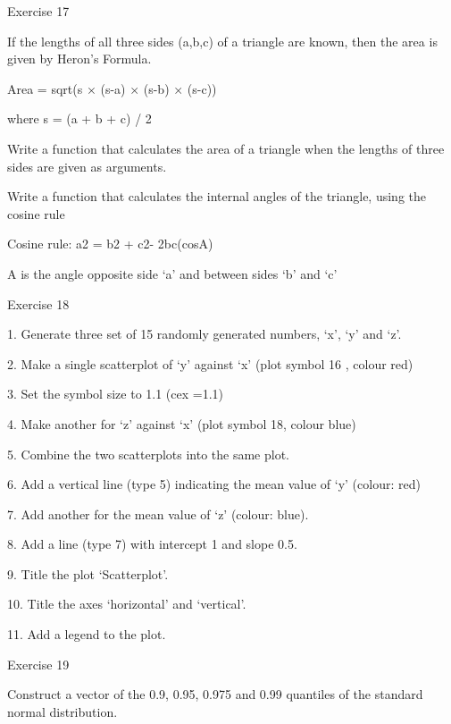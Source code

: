  

Exercise 17

 

If the lengths of all three sides (a,b,c) of a triangle are known, then the area is given by Heron's Formula.

Area = sqrt(s × (s-a) × (s-b) × (s-c))

 

where s = (a + b + c) / 2

 

Write a function that calculates the area of a triangle when the lengths of three sides are given as arguments.

 

Write a function that calculates the internal angles of the triangle, using the cosine rule

Cosine rule: a2 = b2 + c2- 2bc(cosA)

 

A is the angle opposite side ‘a’ and between sides ‘b’ and ‘c’

 

Exercise 18

 
1.
Generate three set of 15 randomly generated numbers, ‘x’, ‘y’ and ‘z’.

2.
Make a single scatterplot of ‘y’ against ‘x’               (plot symbol 16 , colour red)

3.
Set the symbol size to 1.1                                           (cex =1.1)

4.
Make another for ‘z’ against ‘x’                             (plot symbol 18, colour blue)

5.
Combine the two scatterplots into the same plot.

6.
Add a vertical line (type 5) indicating the mean value of ‘y’ (colour: red)

7.
Add another for the mean value of ‘z’                (colour: blue).

8.
Add a line (type 7) with intercept 1 and slope 0.5.

9.
Title the plot ‘Scatterplot’.

10.
Title the axes ‘horizontal’ and ‘vertical’.

11.
Add a legend to the plot.


 

Exercise 19

 

Construct a vector of the 0.9, 0.95, 0.975 and 0.99 quantiles of the standard normal distribution.

 

